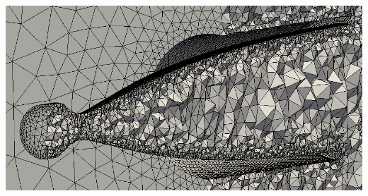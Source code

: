 \begin{frame}
  \hfill
  \begin{minipage}{0.34\textwidth}
     \includegraphics[width=\textwidth]{Figures/nozzle-mesh.png}
     \par\noindent
     \vspace*{25pt}
     \phantom{\rule{\textwidth}{0.5pt}} %
  \end{minipage}

\end{frame}


